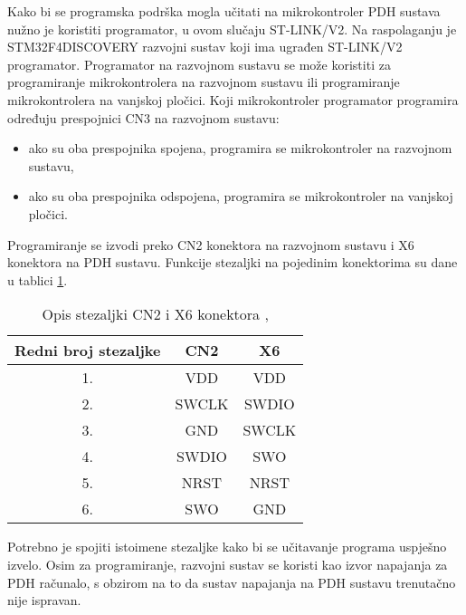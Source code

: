 Kako bi se programska podrška mogla učitati na mikrokontroler PDH sustava nužno je koristiti programator, u ovom slučaju ST-LINK/V2. Na raspolaganju je \\ STM32F4DISCOVERY razvojni sustav koji ima ugrađen ST-LINK/V2 programator. Programator na razvojnom sustavu se može koristiti za programiranje mikrokontrolera na razvojnom sustavu ili programiranje mikrokontrolera na vanjskoj pločici. Koji mikrokontroler programator programira određuju prespojnici CN3 na razvojnom sustavu:
\begin{itemize}
	\item ako su oba prespojnika spojena, programira se mikrokontroler na razvojnom sustavu,
	\item ako su oba prespojnika odspojena, programira se mikrokontroler na vanjskoj pločici.
\end{itemize}
Programiranje se izvodi preko CN2 konektora na razvojnom sustavu i X6 konektora na PDH sustavu. Funkcije stezaljki na pojedinim konektorima su dane u tablici \ref{Tab:conn_func}.
\begin{center}
	\begin{table}[H]
		\centering
		\caption{Opis stezaljki CN2 i X6 konektora \cite{zavrsni_filip_juric}, \cite{disc_manual}}
		\begin{tabular}{| c | c | c |}
			\hline
			Redni broj stezaljke & CN2 & X6 \\
			\hline
			1. & VDD & VDD \\
			\hline
			2. & SWCLK & SWDIO \\
			\hline
			3. & GND & SWCLK \\
			\hline
			4. & SWDIO & SWO \\
			\hline
			5. & NRST & NRST \\
			\hline
			6. & SWO & GND \\
			\hline
		\end{tabular}
		\label{Tab:conn_func}
	\end{table}
\end{center}
Potrebno je spojiti istoimene stezaljke kako bi se učitavanje programa uspješno izvelo. Osim za programiranje, razvojni sustav se koristi kao izvor napajanja za PDH računalo, s obzirom na to da sustav napajanja na PDH sustavu trenutačno nije ispravan.